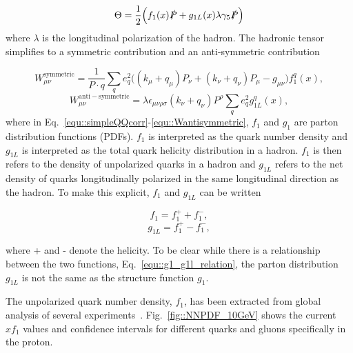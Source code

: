 \begin{equation}
  \label{equ::simpleQQcorr}
  \Theta = \frac{1}{2}
  \Big(
  f_1(x)\slashed{P} +
  g_{1L}(x)\lambda\gamma_5\slashed{P}
  \Big)
\end{equation}
\noindent
where $\lambda$ is the longitudinal polarization of the hadron.  The hadronic
tensor simplifies to a symmetric contribution and an anti-symmetric
contribution~\cite{Barone:2001sp}

\begin{equation}
  \label{equ::simpleHadronTensor}
  W^{\mathrm{symmetric}}_{\mu\nu} = \frac{1}{P\cdot q} \sum_q e_q^2
  \Big( (k_{\mu}+q_{\mu})P_{\nu} + (k_{\nu}+q_{\nu})P_{\mu}-g_{\mu\nu}
  \Big) f_1^q(x),
\end{equation}
\begin{equation}
  W^{\mathrm{anti-symmetric}}_{\mu\nu} =
  \lambda\epsilon_{\mu\nu\rho\sigma}(k_{\nu}+q_{\nu})P^{\rho}\sum_q e^2_q
  g^q_{1L}(x),
  \label{equ::Wantisymmetric}
\end{equation}
\noindent
where in Eq.~\ref{equ::simpleQQcorr}-\ref{equ::Wantisymmetric}, $f_1$ and $g_1$
are parton distribution functions (PDFs).  $f_1$ is interpreted as the quark
number density and $g_{1L}$ is interpreted as the total quark helicity
distribution in a hadron.  $f_1$ is then refers to the density of unpolarized
quarks in a hadron and $g_{1L}$ refers to the net density of quarks
longitudinally polarized in the same longitudinal direction as the hadron.  To
make this explicit, $f_1$ and $g_{1L}$ can be written

\begin{multicols}{2}
  \noindent
  \begin{equation}
    f_1 = f_1^{+} + f_1^{-},
  \end{equation}
  \begin{equation}
    g_{1L} = f_1^{+} - f_1^{-},
  \end{equation}
\end{multicols}
\noindent
where + and - denote the helicity.  To be clear while there is a relationship
between the two functions, Eq.~\ref{equ::g1_g1l_relation}, the parton
distribution $g_{1L}$ is not the same as the structure function $g_1$.

The unpolarized quark number density, $f_1$, has been extracted from global
analysis of several experiments~\cite{Rojo_2015}.  Fig.~\ref{fig::NNPDF_10GeV}
shows the current $xf_1$ values and confidence intervals for different quarks
and gluons specifically in the proton.

